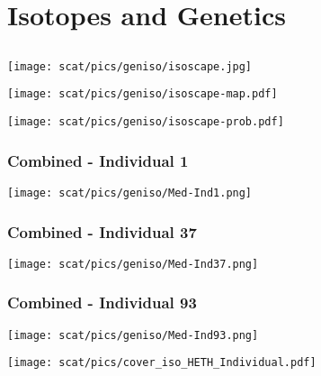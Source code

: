 \section{Isotopes and Genetics}
\subsection{}

\begin{frame}
\begin{center}
\texttt{[image: scat/pics/geniso/isoscape.jpg]}
\end{center}
\end{frame}

\begin{frame}
\begin{center}
\texttt{[image: scat/pics/geniso/isoscape-map.pdf]}
\end{center}
\end{frame}

\begin{frame}
\begin{center}
\texttt{[image: scat/pics/geniso/isoscape-prob.pdf]}
\end{center}
\end{frame}


\begin{frame}
\frametitle{Combined - Individual 1}
\begin{center}
\texttt{[image: scat/pics/geniso/Med-Ind1.png]}
\end{center}
\end{frame}

\begin{frame}
\frametitle{Combined - Individual 37}
\begin{center}
\texttt{[image: scat/pics/geniso/Med-Ind37.png]}
\end{center}
\end{frame}

\begin{frame}
\frametitle{Combined - Individual 93}
\begin{center}
\texttt{[image: scat/pics/geniso/Med-Ind93.png]}
\end{center}
\end{frame}


\begin{frame}
\begin{center}
\texttt{[image: scat/pics/cover\_iso\_HETH\_Individual.pdf]}
\end{center}
\end{frame}

